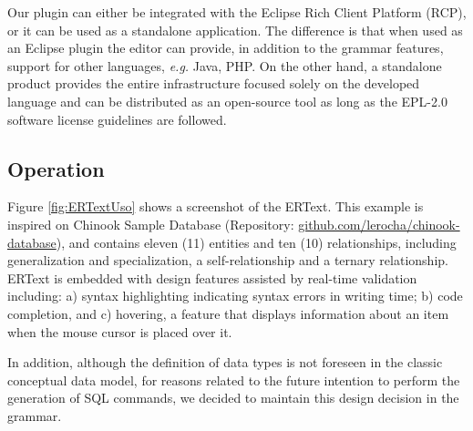 \documentclass[a4paper,twoside,anonymous]{article}
\begin{document}
Our plugin can either be integrated with the Eclipse Rich Client Platform (RCP), or it can be used as a standalone application.
The difference is that when used as an Eclipse plugin the editor can provide, in addition to the grammar features, support for other languages, \textit{e.g.} Java, PHP.
On the other hand, a standalone product provides the entire infrastructure focused solely on the developed language and can be distributed as an open-source tool as long as the EPL-2.0 software license guidelines are followed. 

\subsection{Operation}



Figure \ref{fig:ERTextUso} shows a screenshot of the ERText. %
This example is inspired on Chinook Sample Database (Repository: \url{github.com/lerocha/chinook-database}), and contains eleven (11) entities and ten (10) relationships, including generalization and specialization, a self-relationship and a ternary relationship.
ERText is embedded with design features assisted by real-time validation including: 
a) syntax highlighting  indicating syntax errors in writing time; 
b) code completion, and 
c) hovering, a feature that displays information about an item when the mouse cursor is placed over it.

In addition, although the definition of data types is not foreseen in the classic conceptual data model, for reasons related to the future intention to perform the generation of SQL commands, we decided to maintain this design decision in the grammar. 
\end{document}
